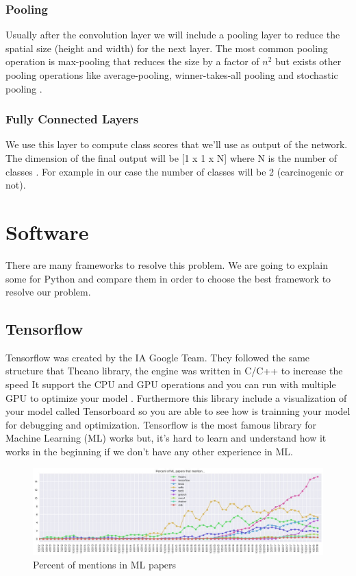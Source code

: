 \subsubsection[Pooling]{Pooling}

Usually after the convolution layer we will include a pooling layer to reduce the spatial size \cite{starteddeeplearning} (height and width) for the next layer. The most common pooling operation is max-pooling that reduces the size by a factor of $n^2$ \cite{greenspan} but exists other pooling operations like average-pooling, winner-takes-all pooling \cite{advancesneuralinformation} and stochastic pooling \cite{stochastic}.

\subsubsection[Fully Connected Layers]{Fully Connected Layers}
We use this layer to compute class scores that we’ll use as output of the network. The dimension of the final output will be [1 x 1 x N] where N is the number of classes \cite{starteddeeplearning}. For example in our case the number of classes will be 2 (carcinogenic or  not).


\section{Software}
There are many frameworks to resolve this problem. We are going to explain some for Python and compare them in order to choose the best framework to resolve our problem. 

\subsection[Tensorflow]{Tensorflow}
Tensorflow was created by the IA Google Team. They followed the same structure that Theano library, the engine was written in C/C++ to increase the speed \cite{generalcomparaison}
It support the CPU and GPU operations and you can run with multiple  GPU to optimize your model \cite{tensorflow}. Furthermore this library include a visualization of your model called Tensorboard so you are able to see how is trainning your model for debugging and optimization. Tensorflow is the most famous library for Machine Learning (ML) works but, it's hard to learn and understand how it works in the beginning if we don't have any other experience in ML.


\begin{figure}[H]
\centering
\includegraphics[width=1\textwidth]{./figures/libraries}
\caption{Percent of mentions in ML papers \cite{ml-mentions-image}}
\end{figure}


